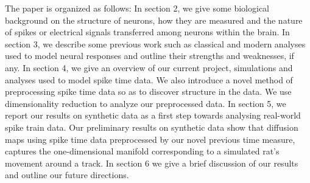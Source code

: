 The  paper is organized as follows: In section 2, we give some biological background on the structure of neurons,
how they are measured and the nature of spikes or electrical signals transferred among neurons within the brain.
In section 3, we describe some previous work such as classical and modern analyses used to model neural responses
and outline their strengths and weaknesses, if any. In section 4, we give an overview of our current project, simulations and analyses used to model spike time data.  We also introduce a novel method of preprocessing spike time data so as to discover structure in the data. We use dimensionality reduction to analyze our preprocessed data.  In section 5, we report our results on synthetic data as a first step towards analysing real-world spike train data. Our preliminary results on synthetic data show that diffusion maps using spike time data preprocessed by our novel previous time measure,
captures the  one-dimen\-sional manifold corresponding to a simulated rat's movement around a track. In section 6 we give a brief discussion of our results and outline our future directions.
 
 
 
 
 
 
 
 
 
 
 
 
 
 
 
 
 
 
 
 
 
 
 



